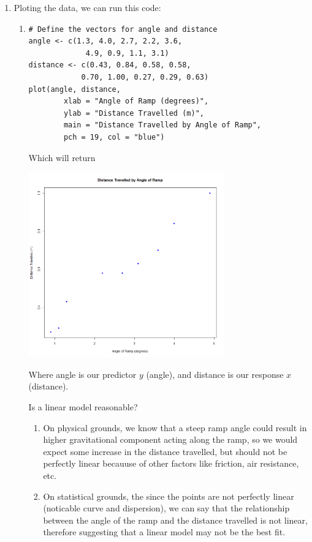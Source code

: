 \documentclass[12pt]{article}
\begin{document}
\begin{enumerate}[1.]
        \item Ploting the data, we can run this code:
            \begin{enumerate}
                \item 
                \begin{verbatim}
# Define the vectors for angle and distance
angle <- c(1.3, 4.0, 2.7, 2.2, 3.6,
             4.9, 0.9, 1.1, 3.1)
distance <- c(0.43, 0.84, 0.58, 0.58, 
            0.70, 1.00, 0.27, 0.29, 0.63)
plot(angle, distance,
        xlab = "Angle of Ramp (degrees)", 
        ylab = "Distance Travelled (m)",
        main = "Distance Travelled by Angle of Ramp", 
        pch = 19, col = "blue")
                \end{verbatim}
                Which will return
            
            \includegraphics[width=0.70\textwidth]{Rplot02.png}

            Where angle is our predictor $y$ (angle), and distance is our response $x$ (distance).

            Is a linear model reasonable?
            \begin{enumerate}
                \item On physical grounds, we know that a steep ramp angle could result in higher gravitational component acting
                along the ramp, so we would expect some increase in the distance travelled, but should not be perfectly linear
                becauuse of other factors like friction, air resistance, etc.
                \item On statistical grounds, the since the points are not perfectly linear (noticable curve and dispersion),
                we can say that the relationship between the angle of the ramp and the distance travelled is not linear, therefore
                suggesting that a linear model may not be the best fit.
            \end{enumerate}


\end{enumerate}
\end{enumerate}
\end{document}
